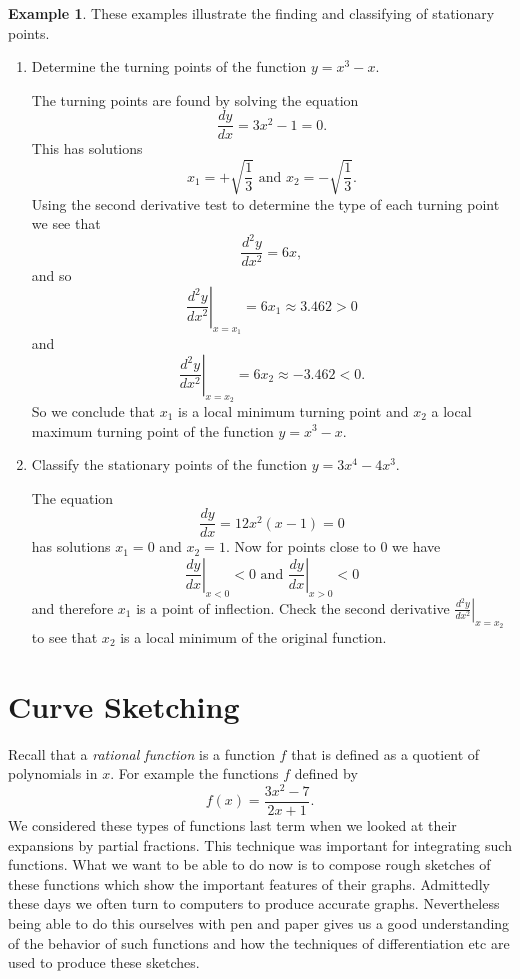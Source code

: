 \documentclass[extrafontsizes, twoside, a4paper]{memoir}
\theoremstyle{plain}%
\theoremstyle{definition}
\newtheorem{exmp}{Example}[chapter]
\theoremstyle{remark}
\begin{document}
\begin{exmp}
These examples illustrate the finding and classifying of stationary points.
\begin{enumerate}
\item
Determine the turning points of the function $y=x^3 - x$.

The turning points are found by solving the equation
$$\frac{dy}{dx} = 3x^2 - 1 =0.$$
This has solutions
$$x_1 = + \sqrt{\frac{1}{3}} \text{ and } x_2 = - \sqrt{\frac{1}{3}} .$$
Using the second derivative test to determine the type of each turning point we see that
$$\frac{d^2 y}{dx^2} = 6x ,$$
and so
$$\left. \frac{d^2 y}{dx^2} \right |_{x=x_1} = 6x_1 \approx 3.462 > 0$$
and
$$\left. \frac{d^2 y}{dx^2} \right |_{x=x_2} = 6x_2 \approx -3.462 < 0.$$
So we conclude that $x_1$ is a local minimum turning point and $x_2$ a local maximum turning point of the function $y=x^3 - x$.
\item
Classify the stationary points of the function $y=3x^4 - 4x^3$.

The equation
$$\frac{dy}{dx} = 12x^2 (x-1) =0$$
has solutions $x_1=0$ and $x_2=1$. Now for points close to 0 we have
$$ \left. \frac{dy}{dx} \right |_{x < 0} < 0 \text{ and } \left. \frac{dy}{dx} \right |_{x > 0} < 0$$
and therefore $x_1$ is a point of inflection. Check the second derivative $\left. \frac{d^2y}{dx^2} \right |_{x=x_2}$ to see that $x_2$ is a local minimum of the original function.
\end{enumerate}
\end{exmp}
\section{Curve Sketching}

Recall that a \textit{rational function} is a function $f$ that is defined as a quotient of polynomials in $x$. For example the functions $f$ defined by
$$ f(x) = \frac{3x^2 - 7}{2x+1} .$$
We considered these types of functions last term when we looked at their expansions by partial fractions. This technique was important for integrating such functions. What we want to be able to do now is to compose rough sketches of these functions which show the important features of their graphs. Admittedly these days we often turn to computers to produce accurate graphs. Nevertheless being able to do this ourselves with pen and paper gives us a good understanding of the behavior of such functions and how the techniques of differentiation etc are used to produce these sketches.
\end{document}
